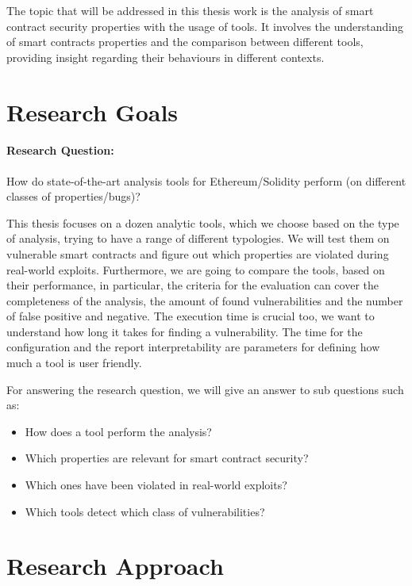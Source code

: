 The topic that will be addressed in this thesis work is the analysis of smart contract security properties with the usage of tools. 
It involves the understanding of smart contracts properties and the comparison between different tools, 
providing insight regarding their behaviours in different contexts.


\section{Research Goals}
\label{sec:Introduction:ResearchGoals}
\paragraph{Research Question:} 
How do state-of-the-art analysis tools for Ethereum/Solidity perform (on different classes of properties/bugs)?

This thesis focuses on a dozen analytic tools, which we choose based on the type of analysis, trying to have a range of different typologies. 
We will test them on vulnerable smart contracts and figure out which properties are violated during real-world exploits. 
Furthermore, we are going to compare the tools, based on their performance, in particular, the criteria for the evaluation can cover the completeness of the analysis, the amount of found vulnerabilities and the number of false positive and negative. 
The execution time is crucial too, we want to understand how long it takes for finding a vulnerability. The time for the configuration and the report interpretability are parameters for defining how much a tool is user friendly. 

For answering the research question, we will give an answer to sub questions such as: 
\begin{itemize}
  \item How does a tool perform the analysis? 
  \item Which properties are relevant for smart contract security?
  \item Which ones have been violated in real-world exploits? 
  \item Which tools detect which class of vulnerabilities? 
\end{itemize}

\section{Research Approach}
\label{sec:Introduction:ResearchApproach}

